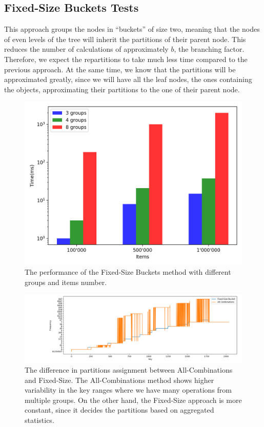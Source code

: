 \subsection{Fixed-Size Buckets Tests}\label{sec:Fixed-Size buckets-tests}
This approach groups the nodes in ``buckets'' of size two, meaning that the nodes of even levels of the tree will inherit the partitions of their parent node. This reduces the number of calculations of approximately $b$, the branching factor. Therefore, we expect the repartitions to take much less time compared to the previous approach. At the same time, we know that the partitions will be approximated greatly, since we will have all the leaf nodes, the ones containing the objects, approximating their partitions to the one of their parent node.

\begin{figure}[!htb]
  \centering
  \includegraphics[width=\textwidth,height=\textheight,keepaspectratio]{img/fixed.png}
  \caption[caption]{The performance of the Fixed-Size Buckets method with different groups and items number.}
  \label{fig:fixed}
\end{figure}

\begin{figure}[!htb]
  \centering
  \includegraphics[width=\textwidth,height=\textheight,keepaspectratio]{img/partition_difference_fixed_all.png}
  \caption[caption]{The difference in partitions assignment between All-Combinations and Fixed-Size. The All-Combinations method shows higher variability in the key ranges where we have many operations from multiple groups. On the other hand, the Fixed-Size approach is more constant, since it decides the partitions based on aggregated statistics.}
  \label{fig:hot}
\end{figure}

